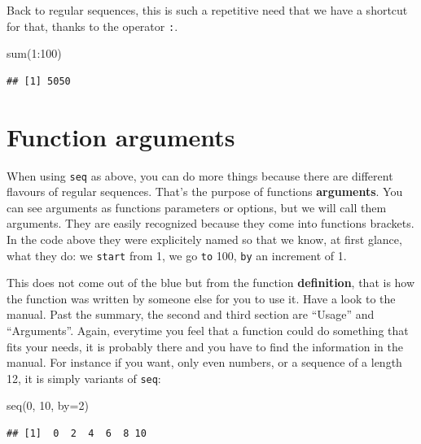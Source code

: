 \documentclass[
]{book}
\newenvironment{Shaded}{\begin{snugshade}}{\end{snugshade}}
\newcommand{\AttributeTok}[1]{\textcolor[rgb]{0.77,0.63,0.00}{#1}}
\newcommand{\DecValTok}[1]{\textcolor[rgb]{0.00,0.00,0.81}{#1}}
\newcommand{\FunctionTok}[1]{\textcolor[rgb]{0.00,0.00,0.00}{#1}}
\newcommand{\NormalTok}[1]{#1}
\newcommand{\SpecialCharTok}[1]{\textcolor[rgb]{0.00,0.00,0.00}{#1}}
\begin{document}
Back to regular sequences, this is such a repetitive need that we have a shortcut for that, thanks to the operator \texttt{:}.

\begin{Shaded}
\begin{Highlighting}[]
\FunctionTok{sum}\NormalTok{(}\DecValTok{1}\SpecialCharTok{:}\DecValTok{100}\NormalTok{)}
\end{Highlighting}
\end{Shaded}

\begin{verbatim}
## [1] 5050
\end{verbatim}

\hypertarget{function-arguments}{%
\section{Function arguments}\label{function-arguments}}

When using \texttt{seq} as above, you can do more things because there are different flavours of regular sequences. That's the purpose of functions \textbf{arguments}. You can see arguments as functions parameters or options, but we will call them arguments. They are easily recognized because they come into functions brackets. In the code above they were explicitely named so that we know, at first glance, what they do: we \texttt{start} from 1, we go \texttt{to} 100, \texttt{by} an increment of 1.

This does not come out of the blue but from the function \textbf{definition}, that is how the function was written by someone else for you to use it. Have a look to the manual. Past the summary, the second and third section are ``Usage'' and ``Arguments''. Again, everytime you feel that a function could do something that fits your needs, it is probably there and you have to find the information in the manual. For instance if you want, only even numbers, or a sequence of a length 12, it is simply variants of \texttt{seq}:

\begin{Shaded}
\begin{Highlighting}[]
\FunctionTok{seq}\NormalTok{(}\DecValTok{0}\NormalTok{, }\DecValTok{10}\NormalTok{, }\AttributeTok{by=}\DecValTok{2}\NormalTok{)}
\end{Highlighting}
\end{Shaded}

\begin{verbatim}
## [1]  0  2  4  6  8 10
\end{verbatim}
\end{document}

